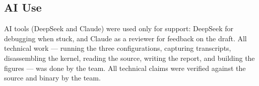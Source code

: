 \documentclass[11pt,a4paper]{article}
\begin{document}
\subsection{AI Use}

AI tools (DeepSeek and Claude) were used only for support: DeepSeek for debugging when stuck, and Claude as a reviewer for feedback on the draft. All technical work --- running the three configurations, capturing transcripts, disassembling the kernel, reading the source, writing the report, and building the figures --- was done by the team. All technical claims were verified against the source and binary by the team.
\end{document}
